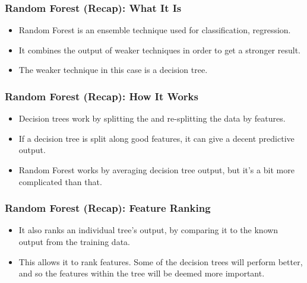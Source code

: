 \begin{frame}[fragile]\frametitle{Random Forest (Recap): What It Is}
\begin{itemize}
\item Random Forest is an ensemble technique used for classification, regression.
\item It combines the output of weaker techniques in order to get a stronger result.
\item The weaker technique in this case is a decision tree. 
\end{itemize}
\end{frame}

\begin{frame}[fragile]\frametitle{Random Forest (Recap): How It Works}
\begin{itemize}
\item Decision trees work by splitting the and re-splitting the data by features.
\item If a decision tree is split along good features, it can give a decent predictive output.
\item Random Forest works by averaging decision tree output, but it's a bit more complicated than that.
\end{itemize}
\end{frame}

\begin{frame}[fragile]\frametitle{Random Forest (Recap): Feature Ranking}
\begin{itemize}
\item It also ranks an individual tree's output, by comparing it to the known output from the training data. 
\item This allows it to rank features. Some of the decision trees will perform better, and so the features within the tree will be deemed more important.
\end{itemize}
\end{frame}





